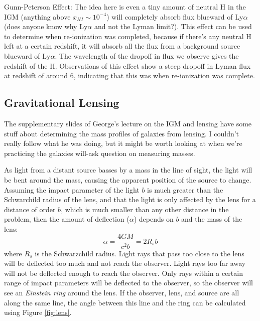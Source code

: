 Gunn-Peterson Effect:\newline
The idea here is even a tiny amount of neutral H in the IGM (anything above
$x_{HI}\sim10^{-4}$) will completely absorb flux blueward of Ly$\alpha$ (does 
anyone know why Ly$\alpha$ and not the Lyman limit?).  This effect can 
be used to determine when re-ionization was completed, because if there's 
any neutral H left at a certain redshift, it will absorb all the flux from 
a background source blueward of Ly$\alpha$.  The wavelength of the dropoff 
in flux we observe gives the redshift of the H.  Observations of this effect 
show a steep dropoff in Lyman flux at redshift of around $6$, indicating that 
this was when re-ionization was complete.  

\subsection{Gravitational Lensing}
The supplementary slides of George's lecture on the IGM and lensing have some 
stuff about determining the mass profiles of galaxies from lensing.  I couldn't 
really follow what he was doing, but it might be worth looking at when we're 
practicing the galaxies will-ask question on measuring masses.  

As light from a distant source basses by a mass in the line of sight, the light 
will be bent around the mass, causing the apparent position of the source to 
change.  Assuming the impact parameter of the light $b$ is much greater than 
the Schwarchild radius of the lens, and that the light is only affected by 
the lens for a distance of order $b$, which is much smaller than any other 
distance in the problem, then the amount of deflection ($\alpha$) 
depends on $b$ and the mass of the lens:
\begin{equation}
\alpha=\frac{4GM}{c^2b}={2R_s}{b}
\end{equation}
where $R_s$ is the Schwarzchild radius.  Light rays that pass too close to the 
lens will be deflected too much and not reach the observer.  Light rays 
too far away will not be deflected enough to reach the observer.  Only 
rays within a certain range of impact parameters will be deflected to the 
observer, so the observer will see an \emph{Einstein ring} around the lens.  
If the observer, lens, and source are all along the same line, the angle 
between this line and the ring can be calculated using Figure \ref{fig:lens}.  


